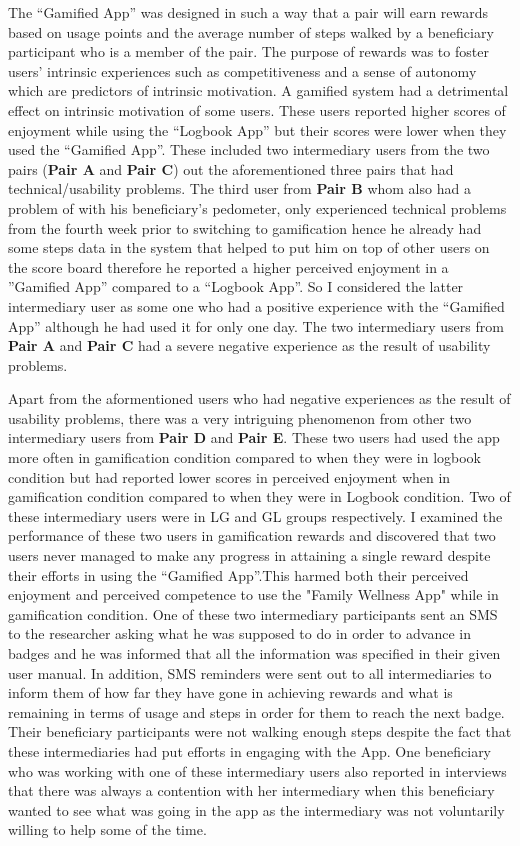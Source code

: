 The ``Gamified App'' was designed in such a way that a pair will earn rewards based on usage points and the average number of steps walked by a beneficiary participant who is a member of the pair. The purpose of rewards was to foster users' intrinsic experiences such as competitiveness and a sense of autonomy which are predictors of intrinsic motivation. A gamified system had  a detrimental effect on intrinsic motivation of some users. These users reported higher scores of enjoyment while using the ``Logbook App'' but their scores were lower when they used the ``Gamified App''. These included two intermediary users from the two pairs (\textbf{Pair A} and \textbf{Pair C}) out the aforementioned three pairs that had technical/usability problems. The third user from \textbf{Pair B} whom also had a problem of with his beneficiary's pedometer, only experienced technical problems from the fourth week prior to switching to gamification hence he already had some steps data in the system that helped to put him on top of other users on the score board therefore he reported a higher perceived enjoyment in a ''Gamified App'' compared to a ``Logbook App''. So I considered the latter intermediary user as some one who had a positive experience with the  ``Gamified App'' although he had used it for only one day. The  two intermediary users from \textbf{Pair A} and \textbf{Pair C} had a severe negative experience as the result of usability problems.   

Apart from the aformentioned users who had negative experiences as the result of usability problems, there was  a very intriguing phenomenon from other two intermediary users from \textbf{Pair D} and \textbf{Pair E}. These two users had used the app more often in gamification condition  compared to when they were in logbook condition but had reported lower scores in perceived enjoyment when in gamification condition compared to when they were in Logbook condition. Two of these intermediary users were  in LG and GL groups respectively. I examined the performance of these two users in gamification rewards and discovered that two users never managed to make any progress in attaining a single reward despite their efforts in using the ``Gamified App''.This harmed both their perceived enjoyment and perceived competence to use the "Family Wellness App" while in gamification condition. One of these two intermediary participants sent an SMS to the researcher asking what he was supposed to do in order to advance in badges and he was informed that all the information was specified in their given user manual. In addition, SMS reminders were sent out to all intermediaries to inform them of how far they have gone in achieving rewards and what is remaining in terms of usage and steps in order for them to reach the next badge. Their beneficiary participants were not walking enough steps despite the fact that these intermediaries had put  efforts in engaging with the App. One beneficiary who was working with one of these intermediary users also reported in interviews that there was always a contention with her intermediary when this beneficiary wanted to see what was going in the app as the intermediary was not voluntarily willing to help some of the time.

